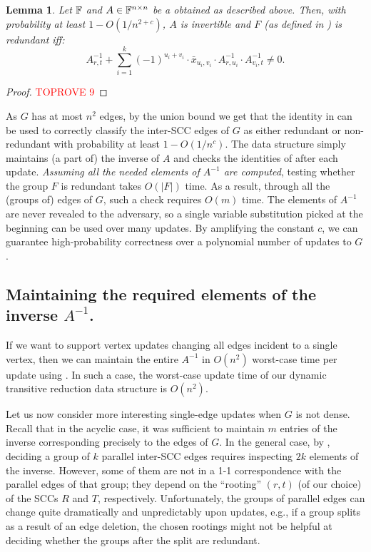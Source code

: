 \documentclass[11pt]{article}
\newtheorem{lemma}[theorem]{Lemma}
\begin{document}
{\begin{lemma}\label{l:random-substitution}
Let $\mathbb{F}$ and
$A\in \mathbb{F}^{n\times n}$ be a obtained as described above.
Then, with probability at least $1-O(1/n^{2+c})$, $A$ is invertible and $F$ (as defined in ) is redundant iff:
\begin{equation*}
A^{-1}_{r,t}+\sum_{i=1}^k (-1)^{u_i+v_i}\cdot \bar{x}_{u_i,v_i}\cdot A^{-1}_{r,u_i}\cdot A^{-1}_{v_i,t}\neq 0.
\end{equation*}
\end{lemma}
\begin{proof}\textcolor{red}{TOPROVE 9}\end{proof}
As $G$ has at most $n^2$ edges, by the union bound we get that the identity in  can be used to correctly classify the inter-SCC edges of $G$ as either redundant or non-redundant with probability at least $1-O(1/n^c)$.
The data structure simply maintains (a part of) the inverse of $A$ and checks the identities
of  after each update.
\emph{Assuming all the needed elements
of $A^{-1}$ are computed}, testing whether the group $F$ is redundant
takes $O(|F|)$ time. As a result, through all the (groups of) edges of $G$, such a check requires $O(m)$ time.
The elements of $A^{-1}$ are never revealed to the adversary, so a single variable substitution picked at the beginning can be used over many updates. By amplifying the constant $c$, we can guarantee high-probability correctness over a polynomial number of updates to $G$.

\subsection{Maintaining the required elements of the inverse $A^{-1}$.}
If we want to support vertex updates changing all edges incident to a single vertex, then we can maintain the entire $A^{-1}$
in $O(n^2)$ worst-case time per update
using . In such a case, the worst-case update time of our dynamic transitive reduction data structure is $O(n^2)$.

Let us now consider more interesting single-edge updates when $G$ is not dense.
Recall that in the acyclic case, it was sufficient
to maintain $m$ entries of the inverse corresponding precisely to the edges of $G$.
In the general case, by ,
deciding a group of $k$ parallel
inter-SCC edges requires inspecting $2k$
elements of the inverse.
However, some of them are not in a 1-1 correspondence with the parallel edges of that group; they depend
on the ``rooting'' $(r,t)$ (of our choice) of the SCCs $R$ and $T$, respectively.
Unfortunately, the groups of parallel edges can change quite dramatically and unpredictably upon updates, e.g., if a group splits as a result of an edge deletion,
the chosen rootings might not be helpful at deciding whether the groups after the split are redundant.

}
\end{document}
